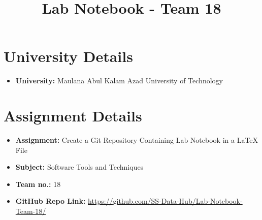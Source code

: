 \documentclass[a4paper,12pt]{article}
\title{Lab Notebook - Team 18}
\author{}
\date{}
\begin{document}
\maketitle
\thispagestyle{fancy}
\pagestyle{fancy}

\section*{University Details}
\begin{itemize}
    \item \textbf{University:} Maulana Abul Kalam Azad University of Technology
\end{itemize}

\section*{Assignment Details}
\begin{itemize}
    \item \textbf{Assignment:} Create a Git Repository Containing Lab Notebook in a LaTeX File
    \item \textbf{Subject:} Software Tools and Techniques
    \item \textbf{Team no.:} 18
    \item \textbf{GitHub Repo Link:} \url{https://github.com/SS-Data-Hub/Lab-Notebook-Team-18/}
\end{itemize}
\end{document}
